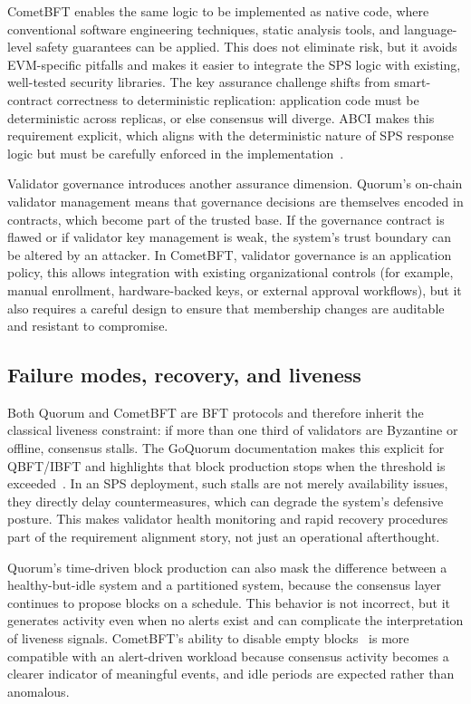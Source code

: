CometBFT enables the same logic to be implemented as native code, where conventional software engineering techniques, static analysis tools, and language-level safety guarantees can be applied. This does not eliminate risk, but it avoids EVM-specific pitfalls and makes it easier to integrate the SPS logic with existing, well-tested security libraries. The key assurance challenge shifts from smart-contract correctness to deterministic replication: application code must be deterministic across replicas, or else consensus will diverge. ABCI makes this requirement explicit, which aligns with the deterministic nature of SPS response logic but must be carefully enforced in the implementation~\cite{abciOverview}.

Validator governance introduces another assurance dimension. Quorum's on-chain validator management means that governance decisions are themselves encoded in contracts, which become part of the trusted base. If the governance contract is flawed or if validator key management is weak, the system's trust boundary can be altered by an attacker. In CometBFT, validator governance is an application policy, this allows integration with existing organizational controls (for example, manual enrollment, hardware-backed keys, or external approval workflows), but it also requires a careful design to ensure that membership changes are auditable and resistant to compromise.

\subsection{Failure modes, recovery, and liveness}
Both Quorum and CometBFT are BFT protocols and therefore inherit the classical liveness constraint: if more than one third of validators are Byzantine or offline, consensus stalls. The GoQuorum documentation makes this explicit for QBFT/IBFT and highlights that block production stops when the threshold is exceeded~\cite{QBFTCons90:online}. In an SPS deployment, such stalls are not merely availability issues, they directly delay countermeasures, which can degrade the system's defensive posture. This makes validator health monitoring and rapid recovery procedures part of the requirement alignment story, not just an operational afterthought.

Quorum's time-driven block production can also mask the difference between a healthy-but-idle system and a partitioned system, because the consensus layer continues to propose blocks on a schedule. This behavior is not incorrect, but it generates activity even when no alerts exist and can complicate the interpretation of liveness signals. CometBFT's ability to disable empty blocks~\cite{cometbftConfig} is more compatible with an alert-driven workload because consensus activity becomes a clearer indicator of meaningful events, and idle periods are expected rather than anomalous.

